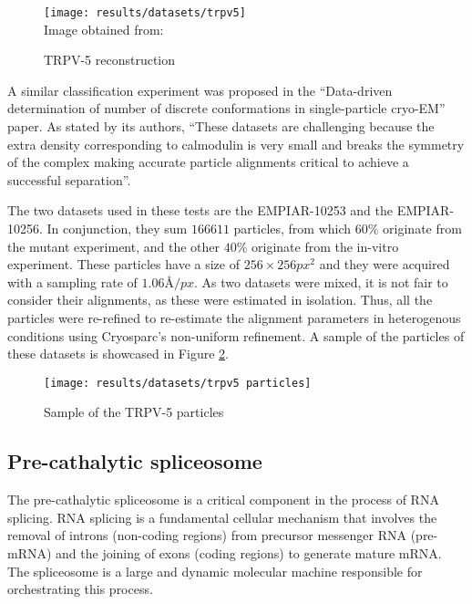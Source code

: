 \documentclass[../main.tex]{subfiles}
\begin{document}
\begin{figure}[htbp]
    \centering
    \texttt{[image: results/datasets/trpv5]}\\
    Image obtained from: \cite{dang2019}
    \caption{TRPV-5 reconstruction}
    \label{fig:5.1:trpv5}
\end{figure}

A similar classification experiment was proposed in the ``Data-driven determination of number of discrete conformations in single-particle cryo-EM'' paper. As stated by its authors, ``These datasets are challenging because the extra density corresponding to calmodulin is very small and breaks the symmetry of the complex making accurate particle alignments critical to achieve a successful separation''\cite{zhou2022}.

The two datasets used in these tests are the EMPIAR-10253\cite{empiar10253} and the EMPIAR-10256\cite{empiar10256}\cite{dang2019}. In conjunction, they sum $166611$ particles, from which $60 \si{\percent}$ originate from the mutant experiment, and the other $40 \si{\percent}$ originate from the in-vitro experiment. These particles have a size of $256 \times 256 \si{px^2}$ and they were acquired with a sampling rate of $1.06 \si{\angstrom/px}$. As two datasets were mixed, it is not fair to consider their alignments, as these were estimated in isolation. Thus, all the particles were re-refined to re-estimate the alignment parameters in heterogenous conditions using Cryosparc's non-uniform refinement\cite{cryosparc}. A sample of the particles of these datasets is showcased in Figure \ref{fig:5.1:trpv5_particles}.
 
\begin{figure}[htbp]
    \centering
    \texttt{[image: results/datasets/trpv5 particles]}
    \caption{Sample of the TRPV-5 particles}
    \label{fig:5.1:trpv5_particles}
\end{figure}

\subsection{Pre-cathalytic spliceosome}
The pre-cathalytic spliceosome is a critical component in the process of RNA splicing. RNA splicing is a fundamental cellular mechanism that involves the removal of introns (non-coding regions) from precursor messenger RNA (pre-mRNA) and the joining of exons (coding regions) to generate mature mRNA. The spliceosome is a large and dynamic molecular machine responsible for orchestrating this process.
\end{document}
